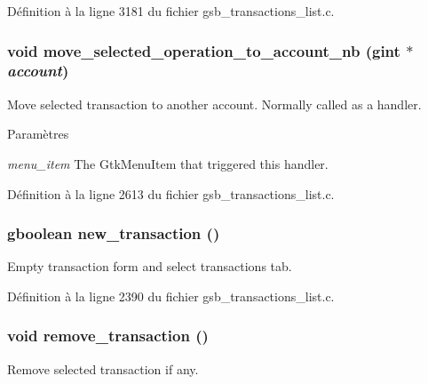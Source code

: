 Définition à la ligne 3181 du fichier gsb\_\-transactions\_\-list.c.

\subsubsection[{move\_\-selected\_\-operation\_\-to\_\-account\_\-nb}]{\setlength{\rightskip}{0pt plus 5cm}void move\_\-selected\_\-operation\_\-to\_\-account\_\-nb (gint $\ast$ {\em account})}\label{gsb__transactions__list_8h_a28b9f175715bce0ac88b473e29ac2fea}
Move selected transaction to another account. Normally called as a handler.


\begin{DoxyParams}{Paramètres}
\item[{\em menu\_\-item}]The GtkMenuItem that triggered this handler. \end{DoxyParams}


Définition à la ligne 2613 du fichier gsb\_\-transactions\_\-list.c.

\subsubsection[{new\_\-transaction}]{\setlength{\rightskip}{0pt plus 5cm}gboolean new\_\-transaction ()}\label{gsb__transactions__list_8h_a2f2bb8bf01af048e33c47d43c8370a21}
Empty transaction form and select transactions tab. 

Définition à la ligne 2390 du fichier gsb\_\-transactions\_\-list.c.

\subsubsection[{remove\_\-transaction}]{\setlength{\rightskip}{0pt plus 5cm}void remove\_\-transaction ()}\label{gsb__transactions__list_8h_aa52082e3faa52c7be3aa7d5dd41d0731}
Remove selected transaction if any. 


